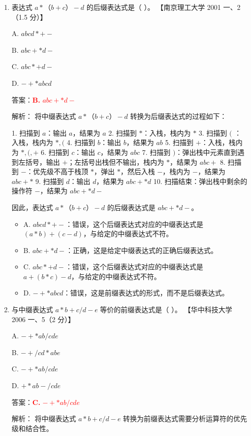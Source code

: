 \documentclass[lang=cn,newtx,10pt,scheme=chinese]{../../../elegantbook}
\begin{document}
\begin{enumerate}
    \item 表达式 $a*（b+c）-d$ 的后缀表达式是（ ）。  
    【南京理工大学 2001 一、2（1.5 分）】  

    A. $abcd *+-$  

    B. $abc+*d-$  

    C. $a b c * + d -$  

    D. $-+*abcd$  

    答案：\textcolor{red}{\textbf{B.} $abc+*d-$}

    解析：
    将中缀表达式 $a*（b+c）-d$ 转换为后缀表达式的过程如下：

    1. 扫描到 $a$：输出 $a$，结果为 $a$
    2. 扫描到 $*$：入栈，栈内为 $*$
    3. 扫描到 $($ ：入栈，栈内为 $*, ($
    4. 扫描到 $b$：输出 $b$，结果为 $ab$
    5. 扫描到 $+$：入栈，栈内为 $*, (, +$
    6. 扫描到 $c$：输出 $c$，结果为 $abc$
    7. 扫描到 $)$：弹出栈中元素直到遇到左括号，输出 $+$；左括号出栈但不输出，栈内为 $*$，结果为 $abc+$
    8. 扫描到 $-$：优先级不高于栈顶 $*$，弹出 $*$，然后入栈 $-$，栈内为 $-$，结果为 $abc+*$
    9. 扫描到 $d$：输出 $d$，结果为 $abc+*d$
    10. 扫描结束：弹出栈中剩余的操作符 $-$，结果为 $abc+*d-$

    因此，表达式 $a*（b+c）-d$ 的后缀表达式是 $abc+*d-$。

    \begin{itemize}
        \item A. $abcd *+-$：错误，这个后缀表达式对应的中缀表达式是 $(a * b) + (c - d)$，与给定的中缀表达式不符。
        \item B. $abc+*d-$：正确，这是给定中缀表达式的正确后缀表达式。
        \item C. $a b c * + d -$：错误，这个后缀表达式对应的中缀表达式是 $a + (b * c) - d$，与给定的中缀表达式不符。
        \item D. $-+*abcd$：错误，这是前缀表达式的形式，而不是后缀表达式。
    \end{itemize}

    \item 与中缀表达式 $a * b + c / d - e$ 等价的前缀表达式是（ ）。  
    【华中科技大学 2006 一、5（2 分）】  

    A. $- + * a b / c d e$  

    B. $- + / c d * a b e$  

    C. $- + * a b / c d e$  

    D. $+ * a b - / c d e$  

    答案：\textcolor{red}{\textbf{C.} $- + * a b / c d e$}

    解析：
    将中缀表达式 $a * b + c / d - e$ 转换为前缀表达式需要分析运算符的优先级和结合性。


\end{enumerate}
\end{document}
